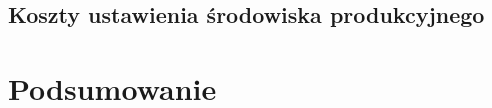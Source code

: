 \documentclass{SGGW-thesis}
\begin{document}
\section{Koszty ustawienia środowiska produkcyjnego}

\chapter{Podsumowanie}

\printbibliography[heading=bibnumbered,title={Bibliografia}]



\beforelastpage
\end{document}
